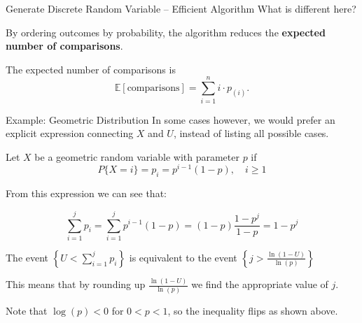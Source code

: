 \documentclass[8pt]{beamer}
\begin{document}
\begin{frame}{Generate Discrete Random Variable -- Efficient Algorithm}
What is different here? 

\vspace{2mm}

By ordering outcomes by probability, the algorithm reduces the \textbf{expected number of comparisons}.

\vspace{2mm}

The expected number of comparisons is
\begin{equation*}
	\mathbb{E}[\text{comparisons}] = \sum_{i=1}^{n} i \cdot p_{(i)}.
\end{equation*}

\begin{center}
\end{center}
\end{frame}

\begin{frame}{Example: Geometric Distribution}
In some cases however, we would prefer an explicit expression connecting $X$ and $U$, instead of listing all possible cases.

\vspace{1mm} 

Let $X$ be a geometric random variable with parameter $p$ if 
    \begin{equation*}
        P\{X = i\} = p_i = p^{i-1}(1-p), \quad i \geq 1
    \end{equation*}
    
\vspace{1mm}

From this expression we can see that:

\[\sum_{i=1}^j p_i =\sum_{i=1}^j p^{i-1}(1-p)=(1-p)\frac{1-p^j}{1-p}=1-p^j\]

The event $\displaystyle{\left\{ U< \sum_{i=1}^{j} p_i \right\}}$ is equivalent to the event 
$\displaystyle{\left\{ j>\frac{\ln(1-U)}{\ln (p)} \right\}}$

This means that by rounding up $\displaystyle{\frac{\ln(1-U)}{\ln (p)}}$ we find the appropriate value of $j$.

\vspace{1mm}

Note that $\log(p) < 0$ for $0 < p < 1$, so the inequality flips as shown above.
\end{frame}
\end{document}
